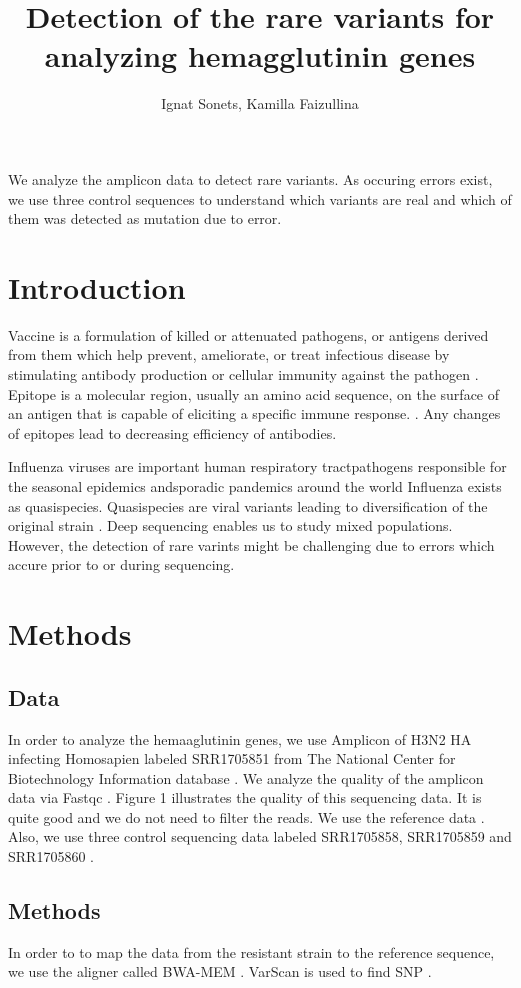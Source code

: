 \documentclass{article}
\title{ Detection of the rare variants for analyzing hemagglutinin genes     }
\author{ Ignat Sonets, Kamilla Faizullina}
\date{\empty}
\begin{document}
\maketitle
We analyze the amplicon data to detect rare variants. As occuring errors exist, we use three control sequences to understand which variants are real and which of them was detected as mutation due to error. 
\section{Introduction}
Vaccine is a formulation of killed or attenuated pathogens, or antigens derived from them which help prevent, ameliorate, or treat infectious disease by stimulating antibody production or cellular immunity against the pathogen \cite{vac}. Epitope is a molecular region, usually an amino acid sequence, on the surface of an antigen that is capable of eliciting a specific immune response. \cite{epit}. Any changes of epitopes lead to decreasing efficiency of antibodies. 

Influenza viruses are important human respiratory tractpathogens responsible for the seasonal epidemics andsporadic pandemics around the world \cite{hv} Influenza exists as quasispecies. Quasispecies are  viral variants leading to diversification of the original strain \cite{quas}. Deep sequencing enables us to study  mixed populations. However, the detection of rare varints might be challenging due to errors which accure prior to or during sequencing. 


\section{Methods}
\subsection{Data}
In order to analyze the hemaaglutinin genes, we use Amplicon of H3N2 HA infecting Homosapien labeled SRR1705851 from The National Center for Biotechnology Information database \cite{ncbi}. We analyze the quality of the amplicon data via Fastqc \cite{fc}. Figure 1 illustrates the quality of this sequencing data. It is quite good and we do not need to filter the reads. We use the reference data \cite{ref}. Also, we use three control sequencing data labeled  SRR1705858, SRR1705859 and SRR1705860 \cite{control}. 
 

\subsection{Methods}
In order to to map the data from the resistant strain to the reference sequence, we use the aligner called BWA-MEM \cite{bwa}.  VarScan is used to find SNP \cite{var}.
\end{document}
